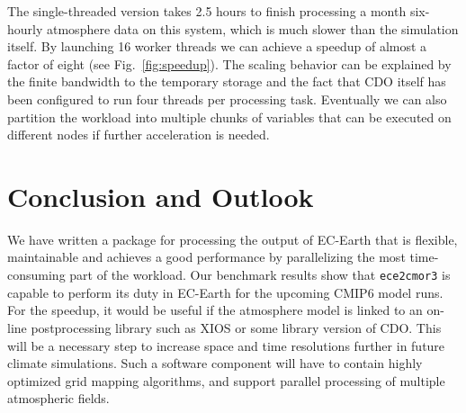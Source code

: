 \documentclass[procedia]{easychair}
\begin{document}
The single-threaded version takes 2.5 hours to finish processing a month 
six-hourly atmosphere data on this system, which is much slower than the 
simulation itself. By launching 16 worker threads we can achieve a speedup of 
almost a factor of eight (see Fig.~\ref{fig:speedup}). The scaling behavior can 
be explained by the finite bandwidth to the temporary storage and the fact that 
CDO itself has been configured to run four threads per processing task. 
Eventually we can also partition the workload into multiple chunks of variables 
that can be executed on different nodes if further acceleration is needed.


\section{Conclusion and Outlook}

We have written a package for processing the output of EC-Earth that is 
flexible, maintainable and achieves a good performance by parallelizing the 
most time-consuming part of the workload. Our benchmark results show that 
\texttt{ece2cmor3} is capable to perform its duty in EC-Earth for the upcoming 
CMIP6 model runs. For the speedup, it would be useful if the atmosphere model 
is linked to an on-line postprocessing library such as XIOS or some library 
version of CDO. This will be a necessary step to increase space and time 
resolutions further in future climate simulations. Such a software component 
will have to contain highly optimized grid mapping algorithms, and support 
parallel processing of multiple atmospheric fields.



%
\label{sect:bib}

%
%
%


\end{document}
